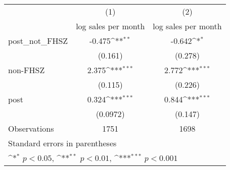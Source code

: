 {
\def\sym#1{\ifmmode^{#1}\else\(^{#1}\)\fi}
\begin{tabular}{l*{2}{c}}
\hline\hline
                    &\multicolumn{1}{c}{(1)}&\multicolumn{1}{c}{(2)}\\
                    &\multicolumn{1}{c}{log sales per month}&\multicolumn{1}{c}{log sales per month}\\
\hline
post\_not\_FHSZ       &      -0.475\sym{**} &      -0.642\sym{*}  \\
                    &     (0.161)         &     (0.278)         \\
[1em]
non-FHSZ            &       2.375\sym{***}&       2.772\sym{***}\\
                    &     (0.115)         &     (0.226)         \\
[1em]
post                &       0.324\sym{***}&       0.844\sym{***}\\
                    &    (0.0972)         &     (0.147)         \\
\hline
Observations        &        1751         &        1698         \\
\hline\hline
\multicolumn{3}{l}{\footnotesize Standard errors in parentheses}\\
\multicolumn{3}{l}{\footnotesize \sym{*} \(p<0.05\), \sym{**} \(p<0.01\), \sym{***} \(p<0.001\)}\\
\end{tabular}
}
